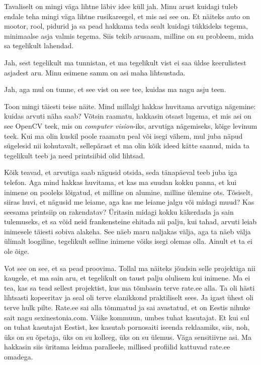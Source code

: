 
Tavaliselt on mingi väga lihtne läbiv idee küll jah. Minu arust kuidagi tuleb 
endale teha mingi väga lihtne rusikareegel, et mis asi see on. Et näiteks auto 
on mootor, rool, pidurid ja  sa pead hakkama teda sealt kuidagi tükkideks 
tegema, minimaalse asja valmis tegema. Siis tekib arusaam, milline on su 
probleem, mida sa tegelikult lahendad. 


Jah, sest tegelikult ma tunnistan, et ma tegelikult vist ei saa üldse 
keerulistest asjadest aru. Minu esimene samm on  asi maha lihtsustada. 


Jah, aga mul on tunne, et see vist on see tee, kuidas ma nagu asju teen. 

Toon mingi täiesti teise näite. Mind millalgi hakkas huvitama  arvutiga 
nägemine: kuidas arvuti näha saab? Võtsin raamatu, hakkasin otsast lugema, et 
mis asi on see OpenCV teek, mis on \emph{computer vision}-iks, arvutiga 
nägemiseks, kõige levinum teek. Kui ma olin kuskil poole raamatu peal või isegi 
vähem, mul juba näpud sügelesid nii kohutavalt, sellepärast et ma olin kõik 
ideed kätte saanud, mida ta tegelikult teeb ja need printsiibid olid lihtsad. 

Kõik teavad, et arvutiga saab  nägusid otsida, seda tänapäeval teeb juba iga 
telefon. Aga mind hakkas huvitama, et kas ma  suudan kokku panna, et kui 
inimene on pooleks lõigatud, et milline on alumine, milline ülemine ots. 
Tõsiselt, siiras huvi, et nägusid me leiame, aga kas me leiame jalgu või midagi 
muud? Kas seesama printsiip on rakendatav? Üritasin midagi kokku käkerdada ja 
sain tulemuseks, et sa võid neid frankensteine ehitada nii palju, kui tahad, 
arvuti leiab inimesele täiesti sobiva alakeha. See näeb maru naljakas välja, 
aga ta näeb välja ülimalt loogiline, tegelikult selline inimene võiks isegi 
olemas olla. Ainult et ta ei ole õige. 

Vot see on see, et sa pead proovima. Tollal ma näiteks jõudsin selle projektiga 
nii kaugele, et ma sain aru, et tegelikult on taust palju olulisem kui inimene. 
Ma ei tea, kas sa tead sellest projektist, kus ma tõmbasin terve 
rate.ee alla. Ta oli hästi lihtsasti 
kopeeritav ja  seal oli terve elanikkond praktiliselt sees. Ja igast ühest oli 
terve hulk pilte. Rate.ee sai alla tõmmatud ja sai avastatud, et on Eestis 
nihuke sait nagu sexinestonia.com. Väike kommuun, umbes tuhat kasutajat. Et kui 
sul on tuhat kasutajat Eestist, kes kasutab pornosaiti  iseenda reklaamiks, 
siis, noh, üks on su õpetaja, üks on su kolleeg, üks on su ülemus. Väga  
sensitiivne asi. Ma hakkasin siis üritama leidma  paralleele, millised 
profiilid kattuvad rate.ee omadega. 

